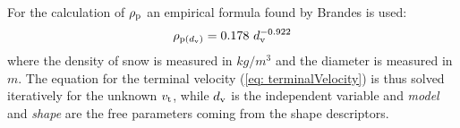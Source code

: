 		For the calculation of $ \rho_{\textup{p}} $ an empirical formula found by Brandes \cite{Brandes-2008} is used:
		\begin{equation}
			\rho_{\textup{p}(\dv)} = 0.178\ \dv^{-0.922}
		\end{equation}
		where the density of snow is measured in $ kg / m^3 $ and the diameter is measured in $ m $. 
		The equation for the terminal velocity (\ref{eq: terminalVelocity}) is thus solved iteratively for the unknown $ v_{\textup{t}} $, while $ d_{\textup{v}} $ is the independent variable and \textit{model} and \textit{shape} are the free parameters coming from the shape descriptors.
		
	
